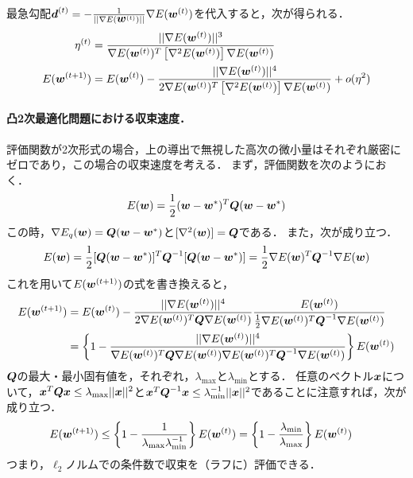 最急勾配$\vd^{(t)}=-\frac{1}{||\nabla E(\vw^{(t)})||} \nabla E(\vw^{(t)})$を代入すると，次が得られる．
\begin{align*}
 \eta^{(t)} &= \frac{||\nabla E(\vw^{(t)})||^3}
 {\nabla E(\vw^{(t)})^T\left[
    \nabla^2E(\vw^{(t)})
  \right]\nabla E(\vw^{(t)})}
\\
  E(\vw^{(t+1)})
  &=E(\vw^{(t)})
  -\frac{||\nabla E(\vw^{(t)})||^4}
  {2\nabla E(\vw^{(t)})^T\left[
     \nabla^2E(\vw^{(t)})
   \right]\nabla E(\vw^{(t)})}
    + o(\eta^2)
\end{align*}


\paragraph{凸2次最適化問題における収束速度．}
評価関数が2次形式の場合，上の導出で無視した高次の微小量はそれぞれ厳密にゼロであり，この場合の収束速度を考える．
まず，評価関数を次のようにおく．
\begin{align*}
 E(\vw) = \frac{1}{2}(\vw-\vw^\ast)^T\vQ(\vw-\vw^\ast)
\end{align*}
この時，$\nabla E_q(\vw)=\vQ(\vw-\vw^\ast)$と$[\nabla^2(\vw)]=\vQ$である．
また，次が成り立つ．
\begin{align*}
 E(\vw) = \frac{1}{2}[\vQ(\vw-\vw^\ast)]^T\vQ^{-1}[\vQ(\vw-\vw^\ast)] =
 \frac{1}{2}\nabla E(\vw)^T\vQ^{-1}\nabla E(\vw)
\end{align*}
これを用いて$E(\vw^{(t+1)})$の式を書き換えると，
\begin{align*}
  E(\vw^{(t+1)})
  &=E(\vw^{(t)})
  -\frac{||\nabla E(\vw^{(t)})||^4}
  {2\nabla E(\vw^{(t)})^T\vQ\nabla E(\vw^{(t)})}
  \frac{E(\vw^{(t)})}{\frac{1}{2}\nabla E(\vw^{(t)})^T\vQ^{-1}\nabla E(\vw^{(t)})}
  \\
  &=
  \left\{
  1-\frac{||\nabla E(\vw^{(t)})||^4}
  {\nabla E(\vw^{(t)})^T\vQ\nabla E(\vw^{(t)})\nabla E(\vw^{(t)})^T\vQ^{-1}\nabla E(\vw^{(t)})}
  \right\}
  E(\vw^{(t)})
\end{align*}
$\vQ$の最大・最小固有値を，それぞれ，$\lambda_{\max}$と$\lambda_{\min}$とする．
任意のベクトル$\vx$について，$\vx^T\vQ\vx \le \lambda_{\max}||\vx||^2$と$\vx^T\vQ^{-1}\vx \le \lambda_{\min}^{-1}||\vx||^2$であることに注意すれば，次が成り立つ．
\begin{align*}
  E(\vw^{(t+1)})
  &\le
  \left\{
  1-\frac{1}
  {\lambda_{\max}\lambda_{\min}^{-1}}
  \right\}
  E(\vw^{(t)})
  =
  \left\{
  1-\frac{\lambda_{\min}}
  {\lambda_{\max}}
  \right\}
  E(\vw^{(t)})
\end{align*}
つまり，$\ell_2$ノルムでの条件数で収束を（ラフに）評価できる．

